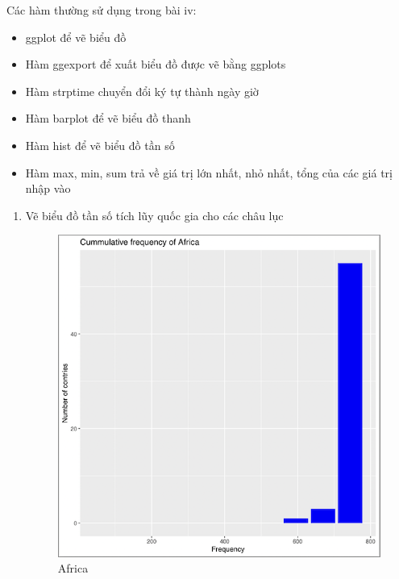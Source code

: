 \documentclass[a4paper]{article}
\theoremstyle{definition}
\begin{document}
\begin{enumerate}[i)]
    Các hàm thường sử dụng trong bài iv:
        \begin{itemize}
\item ggplot để vẽ biểu đồ
\item Hàm ggexport để xuất biểu đồ được vẽ bằng ggplots
\item Hàm strptime chuyển đổi ký tự thành ngày giờ
\item Hàm barplot để vẽ biểu đồ thanh
\item Hàm hist để vẽ biểu đồ tần số
\item Hàm max, min, sum trả về giá trị lớn nhất, nhỏ nhất, tổng của các giá trị nhập vào
        \end{itemize}
		\begin{enumerate}[1]
			\item Vẽ biểu đồ tần số tích lũy quốc gia cho các châu lục
			\begin{figure}[H]
				\centering
				\includegraphics[scale=0.8]{images/4.1.1.png}
				\vspace{5mm}
				\caption{Africa}
			\end{figure}
			\begin{figure}[H]
				\centering

\end{figure}
\end{enumerate}
\end{enumerate}
\end{document}
